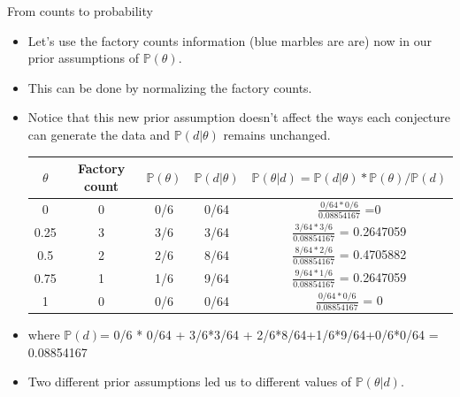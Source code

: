 \documentclass[handout]{beamer}
\begin{document}
\begin{frame}{From counts to probability}
\scriptsize{
\begin{itemize}
\item Let's use the factory counts information (blue marbles are are) now in our prior assumptions of $\mathbb{P}(\theta)$.  \\ 
\item This can be done by normalizing the factory counts.  

\item Notice that this new prior assumption doesn't affect the ways each conjecture can generate the data and $\mathbb{P}(d|\theta)$ remains unchanged.
 
 \vspace{0.3cm}
  \begin{tabular}{c|c|c|c|c} \hline
$\theta$ & Factory count & $\mathbb{P}(\theta)$ &  $\mathbb{P}(d|\theta)$ & $\mathbb{P}(\theta|d) = \mathbb{P}(d|\theta)*\mathbb{P}(\theta) / \mathbb{P}(d)$  \\ \hline
0 & 0 & 0/6 &  0/64 &  $\frac{0/64*0/6}{0.08854167}$ =0 \\
0.25 & 3 & 3/6 & 3/64 & $\frac{3/64*3/6}{0.08854167}$ = 0.2647059
\\
0.5 & 2 & 2/6  & 8/64 & $\frac{8/64*2/6}{0.08854167}$ = 0.4705882 \\
0.75 & 1 &  1/6 & 9/64 & $\frac{9/64*1/6}{0.08854167}$ = 0.2647059  \\
1 &  0 & 0/6 &  0/64 & $\frac{0/64*0/6}{0.08854167}$ = 0 \\ 
\end{tabular} 
\vspace{0.3cm} 
 
\item where $\mathbb{P}(d)$= 0/6 * 0/64 + 3/6*3/64 + 2/6*8/64+1/6*9/64+0/6*0/64 =  0.08854167

\item Two different prior assumptions led us to different values of $\mathbb{P}(\theta|d)$.
 
\end{itemize}
 } 

\end{frame}
\end{document}
